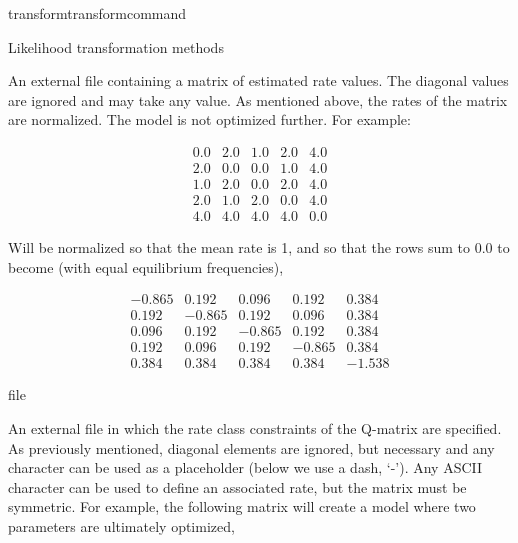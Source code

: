 \begin{command}{transform}{transformcommand}
\begin{arguments}
\begin{argumentgroup}{Likelihood transformation methods}
{\begin{description}
                        {An external file containing a matrix of estimated rate
                        values. The diagonal values are ignored and may take any
                        value. As mentioned above, the rates of the matrix are
                        normalized. The model is not optimized further. For example:
 
                        \begin{equation*}
                            \begin{array}{ccccc}
                                0.0 & 2.0 & 1.0 & 2.0 & 4.0 \\
                                2.0 & 0.0 & 0.0 & 1.0 & 4.0 \\
                                1.0 & 2.0 & 0.0 & 2.0 & 4.0 \\
                                2.0 & 1.0 & 2.0 & 0.0 & 4.0 \\
                                4.0 & 4.0 & 4.0 & 4.0 & 0.0
                             \end{array}
                        \end{equation*} 

                        Will be normalized so that the mean rate is 1, and so
                        that the rows sum to 0.0 to become (with equal equilibrium
                        frequencies),

                        \begin{equation*}
                            \begin{array}{rrrrr}
                                -0.865 &  0.192 &  0.096 &  0.192 &  0.384 \\
                                 0.192 & -0.865 &  0.192 &  0.096 &  0.384 \\
                                 0.096 &  0.192 & -0.865 &  0.192 &  0.384 \\
                                 0.192 &  0.096 &  0.192 & -0.865 &  0.384 \\
                                 0.384 &  0.384 &  0.384 &  0.384 & -1.538
                             \end{array}
                        \end{equation*} }
                        {file}

                        {An external file in which the rate class constraints of
                        the Q-matrix are specified. As previously mentioned,
                        diagonal elements are ignored, but necessary and any character can
                        be used as a placeholder (below we use a dash, `-'). Any
                        ASCII character can be used to define an associated
                        rate, but the matrix must be symmetric. For example, the
                        following matrix will create a model where two
                        parameters are ultimately optimized,

}
\end{description}}
\end{argumentgroup}
\end{arguments}
\end{command}
